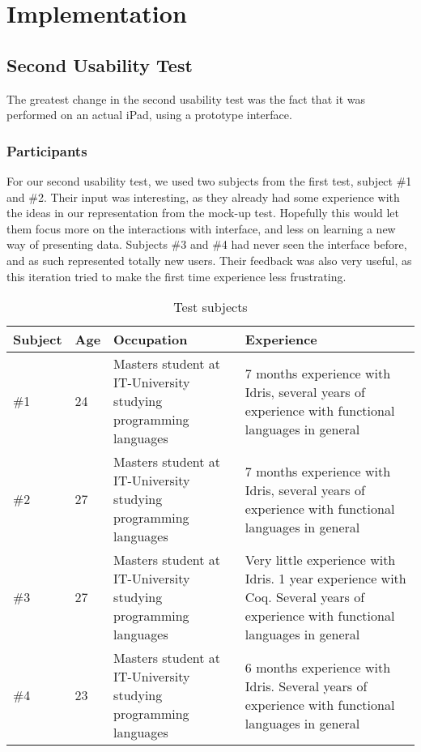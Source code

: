 \section{Implementation}
\label{sec:Implementation}

\subsection{Second Usability Test}
\label{sec:SecondUsabilityTest}
The greatest change in the second usability test was the fact that it was
performed on an actual iPad, using a prototype interface. 

\subsubsection{Participants}
For our second usability test, we used two subjects from the first test,
subject \#1 and \#2. Their input was interesting, as they already had some
experience with the ideas in our representation from the mock-up test.
Hopefully this would let them focus more on the interactions with interface,
and less on learning a new way of presenting data. Subjects \#3 and \#4 had
never seen the interface before, and as such represented totally new users.
Their feedback was also very useful, as this iteration tried to make the first
time experience less frustrating.

\begin{table}[h]
\centering
\begin{tabular}{| l | l | p{5cm} | p{5cm} |}
\hline
Subject & Age & Occupation & Experience \\ \hline
\#1 & 24 & Masters student at IT-University studying programming languages & 7 months experience with Idris, several years of experience with functional languages in general \\ \hline
\#2 & 27 & Masters student at IT-University studying programming languages & 7 months experience with Idris, several years of experience with functional languages in general \\ \hline
\#3 & 27 & Masters student at IT-University studying programming languages & Very little experience with Idris. 1 year experience with Coq. Several years of experience with functional languages in general \\ \hline
\#4 & 23 & Masters student at IT-University studying programming languages & 6 months experience with Idris. Several years of experience with functional languages in general \\ \hline
\end{tabular}
\caption {Test subjects}
\label{table:second_test_subjects}
\end{table}

